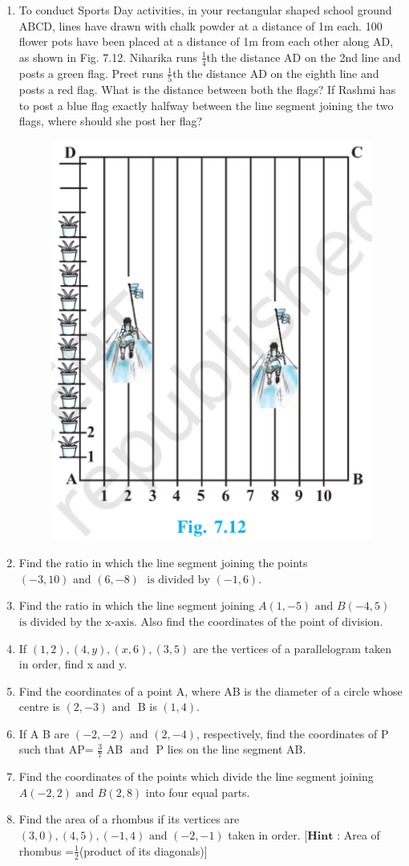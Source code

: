 \documentclass[12pt]{article}
\let\vec\mathbf
\begin{document}
\begin{enumerate}
\item To conduct Sports Day activities, in your rectangular shaped school                   
ground ABCD, lines have 
drawn with chalk powder at a                 
distance of 1m each. 100 flower pots have been placed at a distance of 1m 
from each other along AD, as shown 
in Fig. 7.12. Niharika runs $ \displaystyle \frac 14 $th the 
distance AD on the 2nd line and 
posts a green flag. Preet runs $ \displaystyle \frac 15 $th 
the distance AD on the eighth line 
and posts a red flag. What is the 
distance between both the flags? If 
Rashmi has to post a blue flag exactly 
halfway between the line segment 
joining the two flags, where should 
she post her flag?
\begin{figure}[h!]
  \centering
  \includegraphics[width=0.5\columnwidth]{sc}
  \caption{}
\label{fig:10/7/12Fig1}
\end{figure}                     
\item Find the ratio in which the line segment joining the points $(-3,10) \text{ and } (6,-8)$ $\text{ is divided by } (-1,6)$.
\item Find the ratio in which the line segment joining $A(1,-5) \text{ and } B(-4,5)$ $\text{is divided by the x-axis}$. Also find the coordinates of the point of division.
\item If $(1,2), (4,y), (x,6), (3,5)$ are the vertices of a parallelogram taken in order, find x and y.
\item Find the coordinates of a point A, where AB is the diameter of a circle whose centre is $(2,-3) \text{ and }$ B is $(1,4)$.
\item If A  B are $(-2,-2) \text{ and } (2,-4)$, respectively, find the coordinates of P such that AP= $\displaystyle \frac 37$ AB $\text{ and }$ P lies on the line segment AB.
\item Find the coordinates of the points which divide the line segment joining $A(-2,2) \text{ and } B(2,8)$ into four equal parts.
\item Find the area of a rhombus if its vertices are $(3,0), (4,5), (-1,4) \text{ and } (-2,-1)$ taken in order. [$\vec{Hint}$ : Area of rhombus =$\displaystyle \frac 12$(product of its diagonals)]

\end{enumerate}
\end{document}
